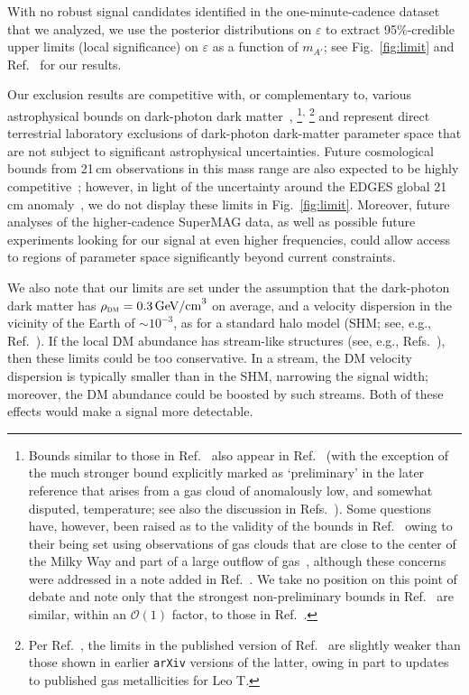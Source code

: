 \documentclass[amsmath,amssymb,aps,10pt,prd,letterpaper,nofootinbib,balancelastpage,notitlepage,superscriptaddress,twocolumn,floatfix]{revtex4-2}
\newcommand{\up}[1]{\textsuperscript{#1}}			%
\newcommand{\figref}[2][]{Fig{#1}.~\ref{#2}}		%
\newcommand{\citeR}[2][]{Ref{#1}.~\cite{#2}}		%
\begin{document}
With no robust signal candidates identified in the one-minute-cadence dataset that we analyzed, we use the posterior distributions on $\varepsilon$ to extract 95\%-credible upper limits (local significance) on $\varepsilon$ as a function of $m_{A'}$; see \figref{fig:limit} and \citeR{Fedderke:2021qva} for our results.

Our exclusion results are competitive with, or complementary to, various astrophysical bounds on dark-photon dark matter~\cite{Dubovsky:2015cca,McDermott:2019lch,Wadekar:2019xnf},%
\footnote{\label{ftnt:otherRefs}%
    Bounds similar to those in \citeR{Wadekar:2019xnf} also appear in \citeR{Bhoonah:2018gjb} (with the exception of the much stronger bound explicitly marked as `preliminary' in the later reference that arises from a gas cloud of anomalously low, and somewhat disputed, temperature; see also the discussion in \citeR[s]{Farrar:2019qrv,Bhoonah:2018wmw}).
    Some questions have, however, been raised as to the validity of the bounds in \citeR{Bhoonah:2018gjb} owing to their being set using observations of gas clouds that are close to the center of the Milky Way and part of a large outflow of gas~\cite{Wadekar:2019xnf}, although these concerns were addressed in a note added in \citeR{Bhoonah:2018gjb}.
    We take no position on this point of debate and note only that the strongest non-preliminary bounds in \citeR{Bhoonah:2018gjb} are similar, within an $\mathcal{O}(1)$ factor, to those in \citeR{Wadekar:2019xnf}.
}\up{,}%
\footnote{\label{ftnt:limitupdate}%
    Per \citeR{WadekarPrivate2021}, the limits in the published version of \citeR{Wadekar:2019xnf} are slightly weaker than those shown in earlier \texttt{arXiv} versions of the latter, owing in part to updates to published gas metallicities for Leo T.
} %
and represent direct terrestrial laboratory exclusions of dark-photon dark-matter parameter space that are not subject to significant astrophysical uncertainties.
Future cosmological bounds from 21\,cm observations in this mass range are also expected to be highly competitive~\cite{Kovetz:2018zes}; however, in light of the uncertainty around the EDGES global 21\,cm anomaly~\cite{Bowman:2018sdg}, we do not display these limits in \figref{fig:limit}.
Moreover, future analyses of the higher-cadence SuperMAG data, as well as possible future experiments looking for our signal at even higher frequencies, could allow access to regions of parameter space significantly beyond current constraints.

We also note that our limits are set under the assumption that the dark-photon dark matter has $\rho_{\textsc{dm}} = 0.3\,\text{GeV/cm}^3$ on average, and a velocity dispersion in the vicinity of the Earth of $\sim 10^{-3}$, as for a standard halo model (SHM; see, e.g., \citeR{Evans:2018bqy}).
If the local DM abundance has stream-like structures (see, e.g., \citeR[s]{Myeong:2017skt,myeong2018shards,Lancaster_2019,Malhan_2018,Meingast_2019,OHare:2019qxc}), then these limits could be too conservative.
In a stream, the DM velocity dispersion is typically smaller than in the SHM, narrowing the signal width; moreover, the DM abundance could be boosted by such streams.
Both of these effects would make a signal more detectable.
\end{document}
